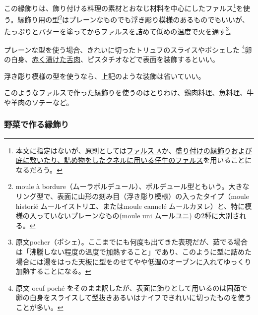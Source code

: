 \begin{recette}


この縁飾りは、飾り付ける料理の素材とおなじ材料を中心にしたファルス\footnote{本文に指定はないが、原則としては\protect\hyperlink{farce-a}{ファルス
  A}か、\protect\hyperlink{farce-de-veau-pour-bordures}{盛り付けの縁飾りおよび底に敷いたり、詰め物をしたクネルに用いる仔牛のファルス}を用いることになるだろう。}を使う。縁飾り用の型\footnote{moule
  à
  bordure（ムーラボルデュール）、ボルデュール型ともいう。大きなリング型で、表面に山形の刻み目（浮き彫り模様）の入ったタイプ（moule
  historié ムールイストリエ、またはmoule cannelé
  ムールカヌレ）と、特に模様の入っていないプレーンなもの(moule uni
  ムールユニ) の2種に大別される。}はプレーンなものでも浮き彫り模様のあるものでもいいが、たっぷりとバターを塗ってからファルスを詰めて低めの温度で火を通す\footnote{原文pocher（ポシェ）。ここまでにも何度も出てきた表現だが、茹でる場合は「沸騰しない程度の温度で加熱すること」であり、このように型に詰めた場合には湯をはった天板に型をのせてやや低温のオーブンに入れてゆっくり加熱することになる。}。

プレーンな型を使う場合、きれいに切ったトリュフのスライスやポシェした
\footnote{原文 oeuf poché
  をそのまま訳したが、表面に飾りとして用いるのは固茹で卵の白身をスライスして型抜きあるいはナイフできれいに切ったものを使うことが多い。}卵の白身、\protect\hyperlink{saumure-liquide-pour-langues}{赤く漬けた舌肉}、ピスタチオなどで表面を装飾するといい。

浮き彫り模様の型を使うなら、上記のような装飾は省いていい。

このようなファルスで作った縁飾りを使うのはとりわけ、鶏肉料理、魚料理、牛や羊肉のソテーなど。

\atoaki{}

\hypertarget{bordures-en-legumes}{%
\subsubsection{野菜で作る縁飾り}\label{bordures-en-legumes}}




\end{recette}
